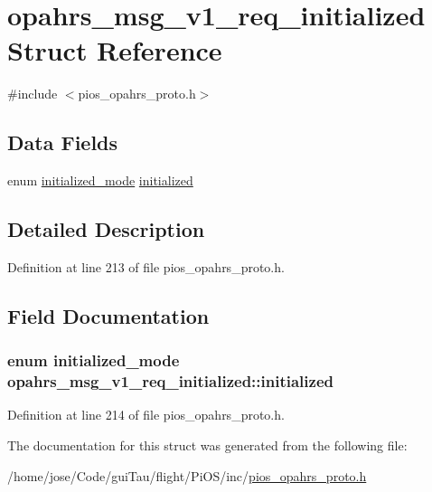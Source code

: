 \hypertarget{structopahrs__msg__v1__req__initialized}{\section{opahrs\-\_\-msg\-\_\-v1\-\_\-req\-\_\-initialized Struct Reference}
\label{structopahrs__msg__v1__req__initialized}
}


{\ttfamily \#include $<$pios\-\_\-opahrs\-\_\-proto.\-h$>$}

\subsection*{Data Fields}
\begin{DoxyCompactItemize}
\item 
enum \hyperlink{group___p_i_o_s___o_p_a_h_r_s_ga46293a5eaecb18912e7ef0f490b742c0}{initialized\-\_\-mode} \hyperlink{structopahrs__msg__v1__req__initialized_abf4f1536462ffaf8916df0ae043e214d}{initialized}
\end{DoxyCompactItemize}


\subsection{Detailed Description}


Definition at line 213 of file pios\-\_\-opahrs\-\_\-proto.\-h.



\subsection{Field Documentation}
\hypertarget{structopahrs__msg__v1__req__initialized_abf4f1536462ffaf8916df0ae043e214d}{
\subsubsection[{initialized}]{\setlength{\rightskip}{0pt plus 5cm}enum {\bf initialized\-\_\-mode} opahrs\-\_\-msg\-\_\-v1\-\_\-req\-\_\-initialized\-::initialized}}\label{structopahrs__msg__v1__req__initialized_abf4f1536462ffaf8916df0ae043e214d}


Definition at line 214 of file pios\-\_\-opahrs\-\_\-proto.\-h.



The documentation for this struct was generated from the following file\-:\begin{DoxyCompactItemize}
\item 
/home/jose/\-Code/gui\-Tau/flight/\-Pi\-O\-S/inc/\hyperlink{pios__opahrs__proto_8h}{pios\-\_\-opahrs\-\_\-proto.\-h}\end{DoxyCompactItemize}
